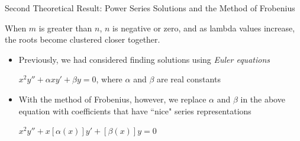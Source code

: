 \documentclass{beamer}
\begin{document}
\begin{frame}{Second Theoretical Result: Power Series Solutions and the Method of Frobenius}

\begin{observation}

When $m$ is greater than $n$, $n$ is negative or zero, and as lambda values increase, the roots become clustered closer together.
 
\end{observation}

\begin{itemize}

\item Previously, we had considered finding solutions using \textit{Euler equations}

\begin{center}

\begin{minipage}{9cm}

\begin{varblock}[9cm]

$x^2y''+\alpha xy'+\beta y=0$, where $\alpha$ and $\beta$ are real constants

\end{varblock}

\end{minipage}

\end{center}

\item With the method of Frobenius, however, we replace $\alpha$ and $\beta$ in the above equation with coefficients that have ``nice" series representations

\begin{center}

\begin{minipage}{6cm}

\begin{varblock}[6cm]

$x^2y'' + x[\alpha(x)]y' + [\beta(x)]y=0$

\end{varblock}

\end{minipage}

\end{center} 

\end{itemize}

\end{frame}
\end{document}
